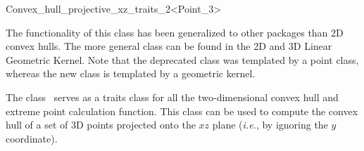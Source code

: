 
\ccAutoIndexingOff
\begin{ccRefClass}{Convex_hull_projective_xz_traits_2<Point_3>}
\ccAutoIndexingOn
{}


\begin{ccDeprecated}
The functionality of this class has been generalized to other packages than 2D convex hulls.
The more general class  can be found in the 2D and 3D Linear Geometric Kernel.
Note that the deprecated class was templated by a point class, whereas the new class
is templated by a geometric kernel.
\end{ccDeprecated}

\ccDefinition
  
The class \ccRefName\ serves as a traits class for all the two-dimensional
convex hull and extreme point calculation function.   This class can be
used to compute the convex hull of a set of 3D points projected onto the
$xz$ plane (\textit{i.e.}, by ignoring the $y$ coordinate).


\ccIsModel

%
 \\

\ccTypes
\ccAutoIndexingOff
{}
\ccThreeToTwo

\ccGlue
{}
\ccGlue
{}
\ccGlue
{}
\ccGlue
{}
\ccGlue
{}
\ccGlue
{}


\end{ccRefClass}
